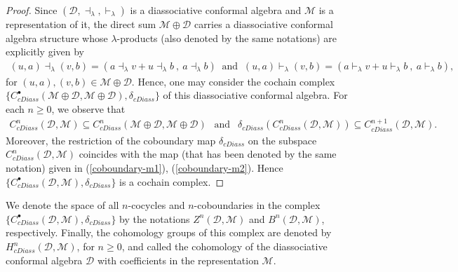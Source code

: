 \documentclass[a4paper,reqno,10pt]{amsart}
\theoremstyle{plain}
\theoremstyle{definition}
\theoremstyle{remark}
\newcommand{\D}{\mathcal{D}}
\newcommand{\M}{\mathcal{M}}
\newcommand{\la}{\lambda}
\begin{document}
\begin{proof}
Since $(\D,\dashv_{\la},\vdash_{\la})$ is a diassociative conformal algebra and $\M$ is a representation of it, the direct sum $\M \oplus \D$ carries a diassociative conformal algebra structure whose $\la$-products (also denoted by the same notations) are explicitly given by
\begin{align*}
    ( u, a) \dashv_\la ( v, b) = (  a \dashv_\la v + u \dashv_\la b ~ \!  , ~ \!  a \dashv_\la b ) ~ \text{ and } ~ ( u, a) \vdash_\la (v, b) = (  a \vdash_\la v + u \vdash_\la b ~ \! , ~ \! a \vdash_\la b),
\end{align*}
for $( u, a), ( v, b) \in \M \oplus \D$. Hence, one may consider the cochain complex $\{ C_{cDiass}^{\bullet}(\M \oplus \D, \M \oplus \D), \delta_{cDiass} \}$ of this diassociative conformal algebra. For each $n \geq 0$, we observe that
\begin{align*}
     C_{cDiass}^{n}(\D,\M) \subseteq C_{cDiass}^{n}(\M \oplus \D, \M \oplus \D) ~~ \text{ and } ~~ \delta_{cDiass}  (C_{cDiass}^{n}(\D,\M) ) \subseteq C_{cDiass}^{n+1}(\D,\M).
\end{align*}
Moreover, the restriction of the coboundary map $\delta_{cDiass}$ on the subspace $C_{cDiass}^{n}(\D,\M)$ coincides with the map (that has been denoted by the same notation) given in (\ref{coboundary-m1}), (\ref{coboundary-m2}). Hence $\{C_{cDiass}^{\bullet}(\D,\M), \delta_{cDiass}\}$ is a cochain complex.
\end{proof}

We denote the space of all $n$-cocycles and $n$-coboundaries in the complex $\{C_{cDiass}^{\bullet}(\D,\M), \delta_{cDiass}\}$ by the notations $Z^n(\D,\M)$ and $B^n(\D,\M)$, respectively. Finally, the cohomology groups of this complex are denoted by $H_{cDiass}^{n}(\D,\M)$, for $n \geq 0$, and called the cohomology of the diassociative conformal algebra $\D$ with coefficients in the representation $\M$.
\end{document}
